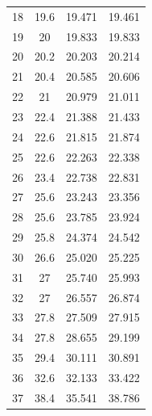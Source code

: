 \begin{table}[H]
\begin{tabular}{cccc}
    18         & 19.6                        & 19.471                & 19.461                 \\
    19         & 20                          & 19.833                & 19.833                 \\
    20         & 20.2                        & 20.203                & 20.214                 \\
    21         & 20.4                        & 20.585                & 20.606                 \\
    22         & 21                          & 20.979                & 21.011                 \\
    23         & 22.4                        & 21.388                & 21.433                 \\
    24         & 22.6                        & 21.815                & 21.874                 \\
    25         & 22.6                        & 22.263                & 22.338                 \\
    26         & 23.4                        & 22.738                & 22.831                 \\
    27         & 25.6                        & 23.243                & 23.356                 \\
    28         & 25.6                        & 23.785                & 23.924                 \\
    29         & 25.8                        & 24.374                & 24.542                 \\
    30         & 26.6                        & 25.020                & 25.225                 \\
    31         & 27                          & 25.740                & 25.993                 \\
    32         & 27                          & 26.557                & 26.874                 \\
    33         & 27.8                        & 27.509                & 27.915                 \\
    34         & 27.8                        & 28.655                & 29.199                 \\
    35         & 29.4                        & 30.111                & 30.891                 \\
    36         & 32.6                        & 32.133                & 33.422                 \\
    37         & 38.4                        & 35.541                & 38.786          \\
    \bottomrule      
    \end{tabular}
    \end{table}

